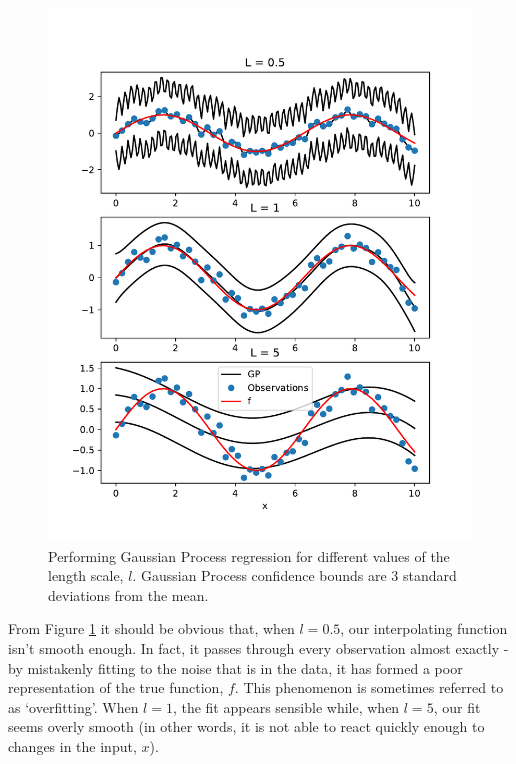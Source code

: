 \documentclass[a4paper, 11pt]{article}
\begin{document}
\begin{figure}[H]
	\centering
	\includegraphics[scale=0.6,trim={0 1cm 0 1cm},clip]{figures/Example1.pdf}
	\caption{Performing Gaussian Process regression for different values of the length scale, $l$. Gaussian Process confidence bounds are 3 standard deviations from the mean.}
	\label{fig:first_regression}
\end{figure}

From Figure \ref{fig:first_regression} it should be obvious that, when $l=0.5$, our interpolating function isn't smooth enough. In fact, it passes through every observation almost exactly - by mistakenly fitting to the noise that is in the data, it has formed a poor representation of the true function, $f$. This phenomenon is sometimes referred to as `overfitting'. When $l=1$, the fit appears sensible while, when $l=5$, our fit seems overly smooth (in other words, it is not able to react quickly enough to changes in the input, $x$). 

\end{document}
